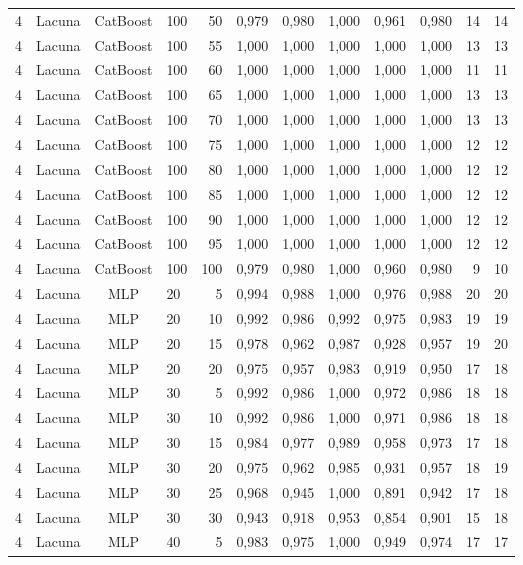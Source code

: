 \begin{longtable}{ccclrrrrrrrr}
4 & Lacuna & CatBoost & 100 & 50 & 0,979 & 0,980 & 1,000 & 0,961 & 0,980 & 14 & 14 \\
4 & Lacuna & CatBoost & 100 & 55 & 1,000 & 1,000 & 1,000 & 1,000 & 1,000 & 13 & 13 \\
4 & Lacuna & CatBoost & 100 & 60 & 1,000 & 1,000 & 1,000 & 1,000 & 1,000 & 11 & 11 \\
4 & Lacuna & CatBoost & 100 & 65 & 1,000 & 1,000 & 1,000 & 1,000 & 1,000 & 13 & 13 \\
4 & Lacuna & CatBoost & 100 & 70 & 1,000 & 1,000 & 1,000 & 1,000 & 1,000 & 13 & 13 \\
4 & Lacuna & CatBoost & 100 & 75 & 1,000 & 1,000 & 1,000 & 1,000 & 1,000 & 12 & 12 \\
4 & Lacuna & CatBoost & 100 & 80 & 1,000 & 1,000 & 1,000 & 1,000 & 1,000 & 12 & 12 \\
4 & Lacuna & CatBoost & 100 & 85 & 1,000 & 1,000 & 1,000 & 1,000 & 1,000 & 12 & 12 \\
4 & Lacuna & CatBoost & 100 & 90 & 1,000 & 1,000 & 1,000 & 1,000 & 1,000 & 12 & 12 \\
4 & Lacuna & CatBoost & 100 & 95 & 1,000 & 1,000 & 1,000 & 1,000 & 1,000 & 12 & 12 \\
4 & Lacuna & CatBoost & 100 & 100 & 0,979 & 0,980 & 1,000 & 0,960 & 0,980 & 9 & 10 \\
4 & Lacuna & MLP & 20 & 5 & 0,994 & 0,988 & 1,000 & 0,976 & 0,988 & 20 & 20 \\
4 & Lacuna & MLP & 20 & 10 & 0,992 & 0,986 & 0,992 & 0,975 & 0,983 & 19 & 19 \\
4 & Lacuna & MLP & 20 & 15 & 0,978 & 0,962 & 0,987 & 0,928 & 0,957 & 19 & 20 \\
4 & Lacuna & MLP & 20 & 20 & 0,975 & 0,957 & 0,983 & 0,919 & 0,950 & 17 & 18 \\
4 & Lacuna & MLP & 30 & 5 & 0,992 & 0,986 & 1,000 & 0,972 & 0,986 & 18 & 18 \\
4 & Lacuna & MLP & 30 & 10 & 0,992 & 0,986 & 1,000 & 0,971 & 0,986 & 18 & 18 \\
4 & Lacuna & MLP & 30 & 15 & 0,984 & 0,977 & 0,989 & 0,958 & 0,973 & 17 & 18 \\
4 & Lacuna & MLP & 30 & 20 & 0,975 & 0,962 & 0,985 & 0,931 & 0,957 & 18 & 19 \\
4 & Lacuna & MLP & 30 & 25 & 0,968 & 0,945 & 1,000 & 0,891 & 0,942 & 17 & 18 \\
4 & Lacuna & MLP & 30 & 30 & 0,943 & 0,918 & 0,953 & 0,854 & 0,901 & 15 & 18 \\
4 & Lacuna & MLP & 40 & 5 & 0,983 & 0,975 & 1,000 & 0,949 & 0,974 & 17 & 17 \\

\end{longtable}
